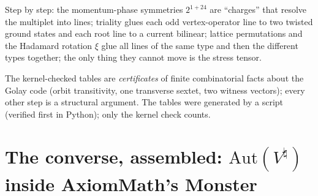 \begin{physics}
Step by step: the momentum-phase symmetries $2^{1+24}$ are ``charges'' that resolve the multiplet into lines; triality glues
each odd vertex-operator line to two twisted ground states and each root line to a current bilinear; lattice permutations
and the Hadamard rotation $\xi$ glue all lines of the same type and then the different types together; the only thing they
cannot move is the stress tensor.
\end{physics}

\begin{remark}
The kernel-checked tables are \emph{certificates} of finite combinatorial facts about the Golay code (orbit
transitivity, one transverse sextet, two witness vectors); every other step is a structural argument.  The tables were
generated by a script (verified first in Python); only the kernel
check counts.
\end{remark}


\section{The converse, assembled: \texorpdfstring{$\mathrm{Aut}(V^\natural)$}{Aut(V-natural)} inside AxiomMath's Monster}\label{ch22:sec:converse}

